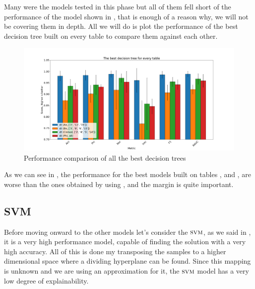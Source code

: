 Many were the models tested in this phase but all of them fell short of the performance of the model
shown in , that is enough of a reason why, we will not be covering them
in depth. All we will do is plot the performance of the best decision tree built on every table to
compare them against each other.
\begin{figure}[h!]
	\centering
	\includegraphics[width=\linewidth]{img/best_dts.png}
	\caption{Performance comparison of all the best decision trees} \label{fig:best-dts}
\end{figure}

As we can see in , the performance for the best models built on tables \bn, \cnmod
and \phin, are worse than the ones obtained by using \an, and the margin is quite important.
\subsection{SVM}
Before moving onward to the other models let's consider the $\svm$, as we said in , it
is a very high performance model, capable of finding the solution with a very high accuracy. All of
this is done my transposing the samples to a higher dimensional space where a dividing hyperplane
can be found. Since this mapping is unknown and we are using an approximation for it, the $\svm$
model has a very low degree of explainability.

